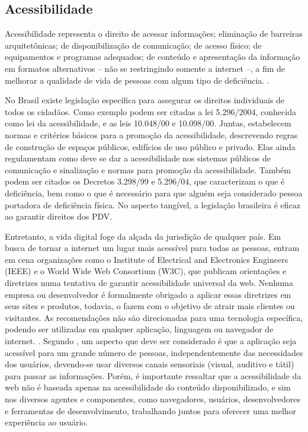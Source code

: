 \documentclass[twoside,english,brazilian]{UNISINOSartigo}
\begin{document}
\subsection{Acessibilidade}
Acessibilidade representa o direito de acessar informações; eliminação de barreiras arquitetônicas; de disponibilização de comunicação; de acesso físico; de equipamentos e programas adequados; de conteúdo e apresentação da informação em formatos alternativos – não se restringindo somente a internet –, a fim de melhorar a qualidade de vida de pessoas com algum tipo de deficiência. \cite{AcessibilidadeBrasil}. 

No Brasil existe legislação específica para assegurar os direitos individuais de todos os cidadãos. Como exemplo podem ser citadas a lei 5.296/2004, conhecida como lei da acessibilidade, e as leis 10.048/00 e 10.098/00. Juntas, estabelecem normas e critérios básicos para a promoção da acessibilidade, descrevendo regras de construção de espaços públicos, edifícios de uso público e privado. Elas ainda regulamentam como deve se dar a acessibilidade nos sistemas públicos de comunicação e sinalização e normas para promoção da acessibilidade. Também podem ser citados os Decretos 3.298/99 e 5.296/04, que caracterizam o que é deficiência, bem como o que é necessário para que alguém seja considerado pessoa portadora de deficiência física. No aspecto tangível, a legislação brasileira é eficaz ao garantir direitos dos PDV.

Entretanto, a vida digital foge da alçada da jurisdição de qualquer país. Em busca de tornar a internet um lugar mais acessível para todas as pessoas, entram em cena organizações como o Institute of Electrical and Electronics Engineers (IEEE) e o World Wide Web Consortium (W3C), que publicam orientações e diretrizes numa tentativa de garantir acessibilidade universal da web. Nenhuma empresa ou desenvolvedor é formalmente obrigado a aplicar essas diretrizes em seus sites e produtos, todavia, o fazem com o objetivo de atrair mais clientes ou visitantes. As recomendações não são direcionadas para uma tecnologia específica, podendo ser utilizadas em qualquer aplicação, linguagem ou navegador de internet. \cite{W3Cguideliness}. Segundo , um aspecto que deve ser considerado é que a aplicação seja acessível para um grande número de pessoas, independentemente das necessidades dos usuários, devendo-se usar diversos canais sensoriais (visual, auditivo e tátil) para passar as informações. Porém, é importante ressaltar que a acessibilidade da web não é baseada apenas na acessibilidade do conteúdo disponibilizado, e sim nos diversos agentes e componentes, como navegadores, usuários, desenvolvedores e ferramentas de desenvolvimento, trabalhando juntos para oferecer uma melhor experiência ao usuário.
\end{document}
